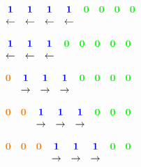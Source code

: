 \documentclass[10pt]{article}
\begin{document}
\begin{figure}[ht]
\begin{center}
\begin{animateinline}[loop, poster = first, controls={play, stop, step}]{0.5}
	\newframe
$	\begin{matrix}
	\textcolor{blue}{\mathbf{1}} &	
	\textcolor{blue}{\mathbf{1}} &
	\textcolor{blue}{\mathbf{1}} &	
	\textcolor{blue}{\mathbf{1}} &
	\textcolor{green}{\mathbf{0}} & 	
	\textcolor{green}{\mathbf{0}} &	
	\textcolor{green}{\mathbf{0}} &	
	\textcolor{green}{\mathbf{0}} \\	
	\leftarrow & \leftarrow & \leftarrow & \leftarrow &   &   &   &\\
	\end{matrix}$

	\newframe
$	\begin{matrix}
	\textcolor{blue}{\mathbf{1}} &	
	\textcolor{blue}{\mathbf{1}} &	
	\textcolor{blue}{\mathbf{1}} &
	\textcolor{green}{\mathbf{0}} & 	
	\textcolor{green}{\mathbf{0}} &	
	\textcolor{green}{\mathbf{0}} &	
	\textcolor{green}{\mathbf{0}} &		
	\textcolor{green}{\mathbf{0}} \\	
	\leftarrow & \leftarrow & \leftarrow &   &   &   &  & \\
	\end{matrix}$
	
	\newframe
$	\begin{matrix}
	\textcolor{orange}{\mathbf{0}} &	
	\textcolor{blue}{\mathbf{1}} &
	\textcolor{blue}{\mathbf{1}} &	
	\textcolor{blue}{\mathbf{1}} &
	\textcolor{green}{\mathbf{0}} & 	
	\textcolor{green}{\mathbf{0}} &	
	\textcolor{green}{\mathbf{0}} &	
	\textcolor{green}{\mathbf{0}} \\	
	 & \rightarrow & \rightarrow & \rightarrow &   &   &   & \\
	\end{matrix}$

	\newframe
$	\begin{matrix}
	\textcolor{orange}{\mathbf{0}} &	
	\textcolor{orange}{\mathbf{0}} &	
	\textcolor{blue}{\mathbf{1}} &
	\textcolor{blue}{\mathbf{1}} &	
	\textcolor{blue}{\mathbf{1}} &
	\textcolor{green}{\mathbf{0}} &	
	\textcolor{green}{\mathbf{0}} &	
	\textcolor{green}{\mathbf{0}} \\	
	& & \rightarrow & \rightarrow & \rightarrow &   &   &  \\ 
	\end{matrix}$

	\newframe
$	\begin{matrix}
	\textcolor{orange}{\mathbf{0}} &	
	\textcolor{orange}{\mathbf{0}} &	
	\textcolor{orange}{\mathbf{0}} &	
	\textcolor{blue}{\mathbf{1}} &
	\textcolor{blue}{\mathbf{1}} &	
	\textcolor{blue}{\mathbf{1}} &
	\textcolor{green}{\mathbf{0}} &	
	\textcolor{green}{\mathbf{0}} \\	
    & & & \rightarrow & \rightarrow & \rightarrow &   &  \\   
	\end{matrix}$


\end{animateinline}
\end{center}
\end{figure}
\end{document}
